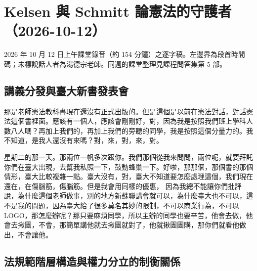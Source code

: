 \chapter{Kelsen 與 Schmitt 論憲法的守護者（2026-10-12）}

2026 年 10 月 12 日上午課堂錄音（約 154 分鐘）之逐字稿。左邊界為段首時間碼；未標說話人者為湯德宗老師。同週的課堂整理見課程問答集第 5 部。


\section{講義分發與臺大新書發表會}

\hypertarget{w05:cue:1}{}那是老師憲法教科書現在還沒有正式出版的。但是這個是以前在憲法對話，對話憲法這個書裡面。應該有一個人，應該會剛剛好，對，因為我是按照我們班上學科人數八人嗎？再加上我們的，再加上我們的旁聽的同學，我是按照這個分量力的。我不知道，是我人還沒有來嗎？對，來，對，來，對。

\hypertarget{w05:cue:3}{}星期二的那一天。那兩位一帆多次跟你。我們那個從我來問問，兩位呢，就要拜託你們在臺大出現，去幫我私照一下，鼓動蜂巢一下。好啦，那那個，那個書的那個情形，臺大比較複雜一點。臺大沒有，對，臺大不知道要怎麼處理這個，我們現在還在，在傷腦筋，傷腦筋。但是我會用同樣的優惠，
\hypertarget{w05:cue:4}{}因為我總不能讓你們批評說，為什麼這個老師做事，別的地方新蘇聯講會就可以，為什麼臺大也不可以，這不是我的問題，因為臺大給了很多莫名其妙的限制，不可以商業行為，不可以 LOGO，那怎麼辦呢？那只要麻煩同學，所以主辦的同學也要辛苦，他會去做，他會去揪團，不會，那簡單講他就去揪團就對了，他就揪團團購，那你們就看他做出，不會讓他。

\section{法規範階層構造與權力分立的制衡關係}

